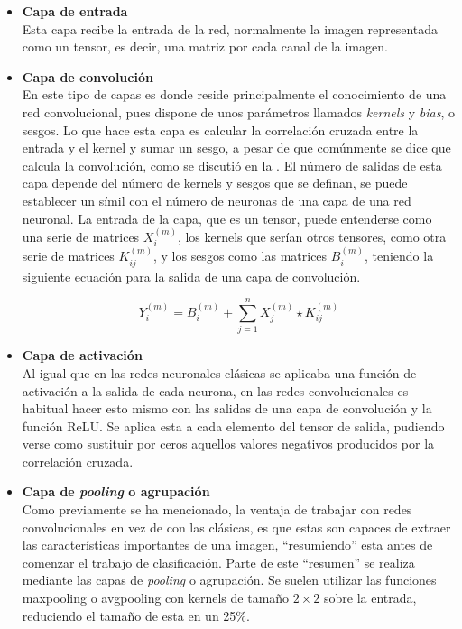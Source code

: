 			\begin{itemize}
				\item \textbf{Capa de entrada}\\
				Esta capa recibe la entrada de la red, normalmente la imagen representada como un tensor, es decir, una matriz por cada canal de la imagen. 
				
				\item \textbf{Capa de convolución}\\
				En este tipo de capas es donde reside principalmente el conocimiento de una red convolucional, pues dispone de unos parámetros llamados \textit{kernels} y \textit{bias}, o sesgos. Lo que hace esta capa es calcular la correlación cruzada entre la entrada y el kernel y sumar un sesgo, a pesar de que comúnmente se dice que calcula la convolución, como se discutió en la . El número de salidas de esta capa depende del número de kernels y sesgos que se definan, se puede establecer un símil con el número de neuronas de una capa de una red neuronal. La entrada de la capa, que es un tensor, puede entenderse como una serie de matrices $X_i^{(m)}$, los kernels que serían otros tensores, como otra serie de matrices $K_{ij}^{(m)}$, y los sesgos como las matrices $B_i^{(m)}$, teniendo la siguiente ecuación para la salida de una capa de convolución. 
				
				$$
				Y_i^{(m)} = B_i^{(m)} + \sum_{j = 1}^n X_j^{(m)} \star K_{ij}^{(m)}
				$$
				
				\item \textbf{Capa de activación}\\
				Al igual que en las redes neuronales clásicas se aplicaba una función de activación a la salida de cada neurona, en las redes convolucionales es habitual hacer esto mismo con las salidas de una capa de convolución y la función ReLU. Se aplica esta a cada elemento del tensor de salida, pudiendo verse como sustituir por ceros aquellos valores negativos producidos por la correlación cruzada. 
				
				\item \textbf{Capa de \textit{pooling} o agrupación}\\
				Como previamente se ha mencionado, la ventaja de trabajar con redes convolucionales en vez de con las clásicas, es que estas son capaces de extraer las características importantes de una imagen, ``resumiendo'' esta antes de comenzar el trabajo de clasificación. Parte de este ``resumen'' se realiza mediante las capas de \textit{pooling} o agrupación. Se suelen utilizar las funciones maxpooling o avgpooling con kernels de tamaño $2\times2$ sobre la entrada, reduciendo el tamaño de esta en un 25\%. 
				

\end{itemize}
